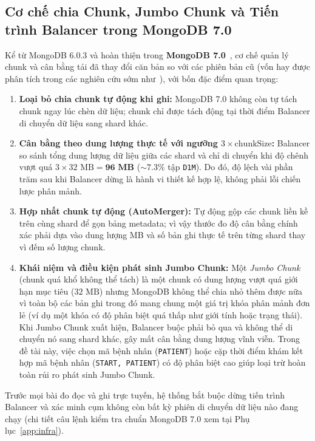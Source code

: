 \subsection{Cơ chế chia Chunk, Jumbo Chunk và Tiến trình Balancer trong MongoDB 7.0}

Kể từ MongoDB 6.0.3 và hoàn thiện trong \textbf{MongoDB 7.0}~\cite{MongoDBSharding}, cơ chế quản lý chunk và cân bằng tải đã thay đổi căn bản so với các phiên bản cũ (vốn hay được phân tích trong các nghiên cứu sớm như~\cite{Liu2012}), với bốn đặc điểm quan trọng:

\begin{enumerate}[leftmargin=0.8cm, itemsep=4pt]
  \item \textbf{Loại bỏ chia chunk tự động khi ghi:} MongoDB 7.0 không còn tự tách chunk ngay lúc chèn dữ liệu; chunk chỉ được tách động tại thời điểm Balancer di chuyển dữ liệu sang shard khác.
  \item \textbf{Cân bằng theo dung lượng thực tế với ngưỡng $3 \times \text{chunkSize}$:} Balancer so sánh tổng dung lượng dữ liệu giữa các shard và chỉ di chuyển khi độ chênh vượt quá $3 \times 32\text{ MB} = \mathbf{96\text{ MB}}$ ($\sim 7.3\%$ tập \texttt{D1M}). Do đó, độ lệch vài phần trăm sau khi Balancer dừng là hành vi thiết kế hợp lệ, không phải lỗi chiến lược phân mảnh.
  \item \textbf{Hợp nhất chunk tự động (AutoMerger):} Tự động gộp các chunk liền kề trên cùng shard để gọn bảng metadata; vì vậy thước đo độ cân bằng chính xác phải dựa vào dung lượng MB và số bản ghi thực tế trên từng shard thay vì đếm số lượng chunk.
  \item \textbf{Khái niệm và điều kiện phát sinh Jumbo Chunk:} Một \textit{Jumbo Chunk} (chunk quá khổ không thể tách) là một chunk có dung lượng vượt quá giới hạn mục tiêu ($32\text{ MB}$) nhưng MongoDB không thể chia nhỏ thêm được nữa vì toàn bộ các bản ghi trong đó mang chung một giá trị khóa phân mảnh đơn lẻ (ví dụ một khóa có độ phân biệt quá thấp như giới tính hoặc trạng thái). Khi Jumbo Chunk xuất hiện, Balancer buộc phải bỏ qua và không thể di chuyển nó sang shard khác, gây mất cân bằng dung lượng vĩnh viễn. Trong đề tài này, việc chọn mã bệnh nhân (\texttt{PATIENT}) hoặc cặp thời điểm khám kết hợp mã bệnh nhân (\texttt{START, PATIENT}) có độ phân biệt cao giúp loại trừ hoàn toàn rủi ro phát sinh Jumbo Chunk.
\end{enumerate}

Trước mọi bài đo đọc và ghi trực tuyến, hệ thống bắt buộc dừng tiến trình Balancer và xác minh cụm không còn bất kỳ phiên di chuyển dữ liệu nào đang chạy (chi tiết câu lệnh kiểm tra chuẩn MongoDB 7.0 xem tại Phụ lục~\ref{app:infra}).
\FloatBarrier
